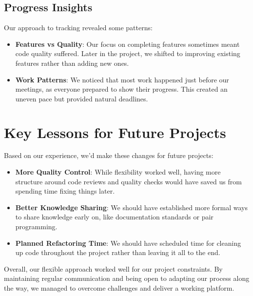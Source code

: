 \subsection{Progress Insights}

Our approach to tracking revealed some patterns:

\begin{itemize}
    \item \textbf{Features vs Quality}: Our focus on completing features sometimes meant code quality suffered. Later in the project, we shifted to improving existing features rather than adding new ones.
    
    \item \textbf{Work Patterns}: We noticed that most work happened just before our meetings, as everyone prepared to show their progress. This created an uneven pace but provided natural deadlines.
\end{itemize}

\section{Key Lessons for Future Projects}

Based on our experience, we'd make these changes for future projects:

\begin{itemize}
    \item \textbf{More Quality Control}: While flexibility worked well, having more structure around code reviews and quality checks would have saved us from spending time fixing things later.
    
    \item \textbf{Better Knowledge Sharing}: We should have established more formal ways to share knowledge early on, like documentation standards or pair programming.
    
    \item \textbf{Planned Refactoring Time}: We should have scheduled time for cleaning up code throughout the project rather than leaving it all to the end.
\end{itemize}

Overall, our flexible approach worked well for our project constraints. By maintaining regular communication and being open to adapting our process along the way, we managed to overcome challenges and deliver a working platform.